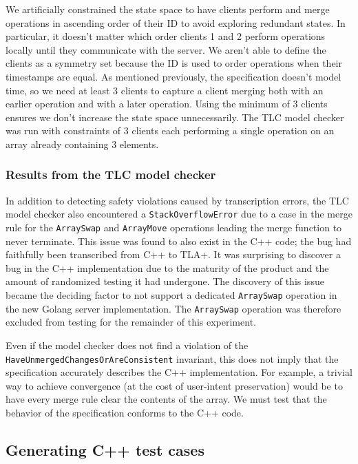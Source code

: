 \documentclass{vldb}
\begin{document}
We artificially constrained the state space to have clients perform and merge operations in ascending order of their ID to avoid exploring redundant states. In particular, it doesn't matter which order clients 1 and 2 perform operations locally until they communicate with the server. We aren't able to define the clients as a symmetry set because the ID is used to order operations when their timestamps are equal. As mentioned previously, the specification doesn't model time, so we need at least 3 clients to capture a client merging both with an earlier operation and with a later operation.
Using the minimum of 3 clients ensures we don't increase the state space unnecessarily.
The TLC model checker was run with constraints of 3 clients each performing a single operation on an array already containing 3 elements.

\subsubsection{Results from the TLC model checker}

In addition to detecting safety violations caused by transcription errors, the TLC model checker also encountered a \texttt{StackOverflowError} due to a case in the merge rule for the \texttt{ArraySwap} and \texttt{ArrayMove} operations leading the merge function to never terminate. This issue was found to also exist in the C++ code; the bug had faithfully been transcribed from C++ to TLA+. It was surprising to discover a bug in the C++ implementation due to the maturity of the product and the amount of randomized testing it had undergone.
The discovery of this issue became the deciding factor to not support a dedicated \texttt{ArraySwap} operation in the new Golang server implementation. The \texttt{ArraySwap} operation was therefore excluded from testing for the remainder of this experiment.

Even if the model checker does not find a violation of the \texttt{HaveUnmergedChangesOrAreConsistent} invariant, this does not imply that the specification accurately describes the C++ implementation.
For example, a trivial way to achieve convergence (at the cost of user-intent preservation) would be to have every merge rule clear the contents of the array. We must test that the behavior of the specification conforms to the C++ code.

\subsection{Generating C++ test cases}
\label{subsec:mbtcg_cpp}
\end{document}

